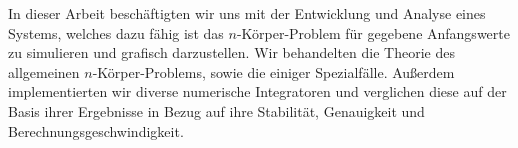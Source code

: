 In dieser Arbeit beschäftigten wir uns mit der Entwicklung und Analyse eines Systems, welches dazu fähig ist das $n$-Körper-Problem für gegebene Anfangswerte zu simulieren und grafisch darzustellen.
Wir behandelten die Theorie des allgemeinen $n$-Körper-Problems, sowie die einiger Spezialfälle.
Außerdem implementierten wir diverse numerische Integratoren und verglichen diese auf der Basis ihrer Ergebnisse in Bezug auf ihre Stabilität, Genauigkeit und Berechnungsgeschwindigkeit.